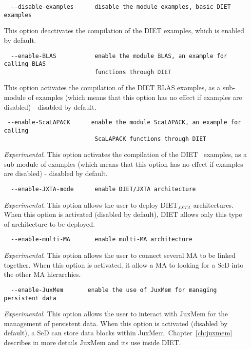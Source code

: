 {\footnotesize
\begin{verbatim}
  --disable-examples      disable the module examples, basic DIET examples
\end{verbatim}
}
\noindent This option deactivates the compilation of the DIET
examples, which is enabled by default.

{\footnotesize
\begin{verbatim}
  --enable-BLAS           enable the module BLAS, an example for calling BLAS
                          functions through DIET
\end{verbatim}
}
\noindent This option activates the compilation of the DIET BLAS
examples, as a sub-module of examples (which means that this option
has no effect if examples are disabled) - disabled by default.


{\footnotesize
\begin{verbatim}
 --enable-ScaLAPACK      enable the module ScaLAPACK, an example for calling
                          ScaLAPACK functions through DIET
\end{verbatim}
}
\noindent \textit{Experimental}.  This option activates the
compilation of the DIET \scalapack\ examples, as a sub-module of
examples (which means that this option has no effect if examples are
disabled) - disabled by default.

{\footnotesize
\begin{verbatim}
  --enable-JXTA-mode      enable DIET/JXTA architecture
\end{verbatim}
}
\noindent \textit{Experimental}.  This option allows the user to
deploy DIET$_{JXTA}$ architectures.  When this option is activated
(disabled by default), DIET allows only this type of architecture to
be deployed.

{\footnotesize
\begin{verbatim}
  --enable-multi-MA       enable multi-MA architecture
\end{verbatim}
}
\noindent \textit{Experimental}.  This option allows the user to
connect several MA to be linked together. When this option is
activated, it allow a MA to looking for a SeD into the other MA
hierarchies.

{\footnotesize
\begin{verbatim}
  --enable-JuxMem       enable the use of JuxMem for managing persistent data
\end{verbatim}
}
\noindent \textit{Experimental}.  This option allows the user to
interact with JuxMem for the management of persistent data. When
this option is activated (disabled by default), a SeD can store data
blocks within JuxMem. Chapter~\ref{ch:juxmem} describes in more
details JuxMem and its use inside DIET.

